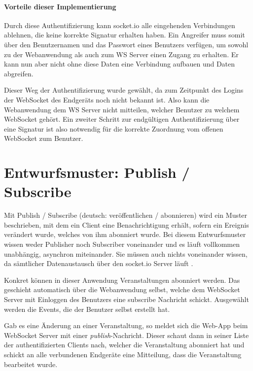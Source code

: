 \paragraph{Vorteile dieser Implementierung}
Durch diese Authentifizierung kann socket.io alle eingehenden Verbindungen ablehnen, die keine korrekte Signatur erhalten haben. Ein Angreifer muss somit über den Benutzernamen und das Passwort eines Benutzers verfügen, um sowohl zu der Webanwendung als auch zum WS Server einen Zugang zu erhalten. Er kann nun aber nicht ohne diese Daten eine Verbindung aufbauen und Daten abgreifen.\par

Dieser Weg der Authentifizierung wurde gewählt, da zum Zeitpunkt des Logins der WebSocket des Endgeräts noch nicht bekannt ist. Also kann die Webanwendung dem WS Server nicht mitteilen, welcher Benutzer zu welchem WebSocket gehört. Ein zweiter Schritt zur endgültigen Authentifizierung über eine Signatur ist also notwendig für die korrekte Zuordnung vom offenen WebSocket zum Benutzer. 


\section{Entwurfsmuster: Publish / Subscribe}
Mit Publish / Subscribe (deutsch: veröffentlichen / abonnieren) wird ein Muster beschrieben, mit dem ein Client eine Benachrichtigung erhält, sofern ein Ereignis verändert wurde, welches von ihm abonniert wurde. Bei diesem Entwurfsmuster wissen weder Publisher noch Subscriber voneinander und es läuft vollkommen unabhängig, asynchron miteinander. Sie müssen auch nichts voneinander wissen, da sämtlicher Datenaustausch über den socket.io Server läuft \cite{autobahn.js:pubsub}.\par

Konkret können in dieser Anwendung Veranstaltungen abonniert werden. Das geschieht automatisch über die Webanwendung selbst, welche dem WebSocket Server mit Einloggen des Benutzers eine subscribe Nachricht schickt. Ausgewählt werden die Events, die der Benutzer selbst erstellt hat. 

Gab es eine Änderung an einer Veranstaltung, so meldet sich die Web-App beim WebSocket Server mit einer \emph{publish}-Nachricht. Dieser schaut dann in seiner Liste der authentifizierten Clients nach, welcher die Veranstaltung abonniert hat und schickt an alle verbundenen Endgeräte eine Mitteilung, dass die Veranstaltung bearbeitet wurde.


